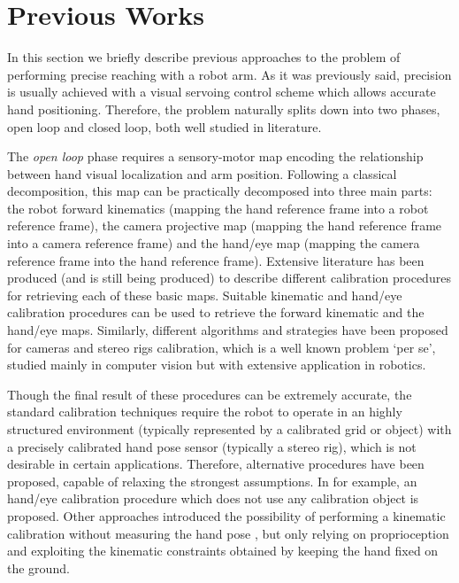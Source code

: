 \section{Previous Works}



In this section we briefly describe previous approaches to the problem of performing precise reaching with a robot arm. As it was previously said, precision is usually achieved with a visual servoing control scheme which allows accurate hand positioning. Therefore, the problem naturally splits down into two phases, open loop and closed loop, both well studied in literature.

The {\em open loop} phase requires a sensory-motor map encoding the relationship between hand visual localization and arm position. Following a classical decomposition, this map can be practically decomposed into three main parts: the robot forward kinematics (mapping the hand reference frame into a robot reference frame), the camera projective map (mapping the hand reference frame into a camera reference frame) and the hand/eye map (mapping the camera reference frame into the hand reference frame). Extensive literature has been produced (and is still being produced) to describe different calibration procedures for retrieving each of these basic maps. Suitable kinematic \cite{Hollerbach96calibration} and hand/eye \cite{Tsai88calibration} calibration procedures can be used to retrieve the forward kinematic and the hand/eye maps. Similarly, different algorithms and strategies have been proposed for cameras and stereo rigs calibration, which is a well known problem `per se', studied mainly in computer vision \cite{Soatto03vision} but with extensive application in robotics. 

Though the final result of these procedures can be extremely accurate, the standard calibration techniques require the robot to operate in an highly structured environment (typically represented by a calibrated grid or object) with a precisely calibrated hand pose sensor (typically a stereo rig), which is not desirable in certain applications. Therefore, alternative procedures have been proposed, capable of relaxing the strongest assumptions. In \cite{AHE01} for example, an hand/eye calibration procedure which does not use any calibration object is proposed. Other approaches introduced the possibility of performing a kinematic calibration without measuring the hand pose \cite{Bennett91calibration}, but only relying on proprioception and exploiting the kinematic constraints obtained by keeping the hand fixed on the ground. 


